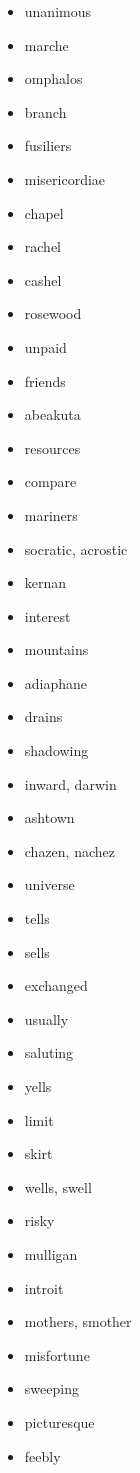 \documentclass{article}
\begin{document}
\begin{itemize}
    \item unanimous
    \item marche
    \item omphalos
    \item branch
    \item fusiliers
    \item misericordiae
    \item chapel
    \item rachel
    \item cashel
    \item rosewood
    \item unpaid
    \item friends
    \item abeakuta
    \item resources
    \item compare
    \item mariners
    \item socratic, acrostic
    \item kernan
    \item interest
    \item mountains
    \item adiaphane
    \item drains
    \item shadowing
    \item inward, darwin
    \item ashtown
    \item chazen, nachez
    \item universe
    \item tells
    \item sells
    \item exchanged
    \item usually
    \item saluting
    \item yells
    \item limit
    \item skirt
    \item wells, swell
    \item risky
    \item mulligan
    \item introit
    \item mothers, smother
    \item misfortune
    \item sweeping
    \item picturesque
    \item feebly

\end{itemize}
\end{document}
